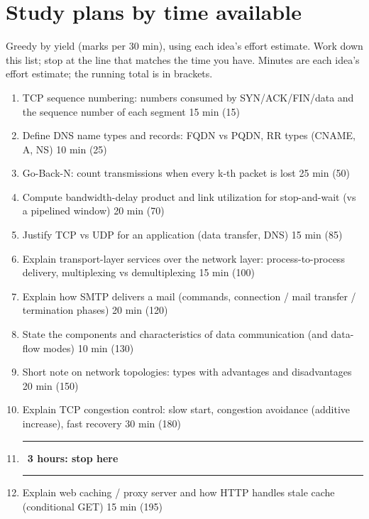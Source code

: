 \section{Study plans by time available}
Greedy by yield (marks per 30 min), using each idea's effort estimate.
Work down this list; stop at the line that matches the time you have. Minutes are each idea's effort estimate; the running total is in brackets.
\begin{enumerate}[itemsep=0pt]
\item TCP sequence numbering: numbers consumed by SYN/ACK/FIN/data and the sequence number of each segment  {\scriptsize\color{muted}15 min (15)}
\item Define DNS name types and records: FQDN vs PQDN, RR types (CNAME, A, NS)  {\scriptsize\color{muted}10 min (25)}
\item Go-Back-N: count transmissions when every k-th packet is lost  {\scriptsize\color{muted}25 min (50)}
\item Compute bandwidth-delay product and link utilization for stop-and-wait (vs a pipelined window)  {\scriptsize\color{muted}20 min (70)}
\item Justify TCP vs UDP for an application (data transfer, DNS)  {\scriptsize\color{muted}15 min (85)}
\item Explain transport-layer services over the network layer: process-to-process delivery, multiplexing vs demultiplexing  {\scriptsize\color{muted}15 min (100)}
\item Explain how SMTP delivers a mail (commands, connection / mail transfer / termination phases)  {\scriptsize\color{muted}20 min (120)}
\item State the components and characteristics of data communication (and data-flow modes)  {\scriptsize\color{muted}10 min (130)}
\item Short note on network topologies: types with advantages and disadvantages  {\scriptsize\color{muted}20 min (150)}
\item Explain TCP congestion control: slow start, congestion avoidance (additive increase), fast recovery  {\scriptsize\color{muted}30 min (180)}
\item[] \textcolor{sgred}{\rule[0.5ex]{3em}{0.6pt}\ \textbf{3 hours: stop here}\ \rule[0.5ex]{3em}{0.6pt}}
\item Explain web caching / proxy server and how HTTP handles stale cache (conditional GET)  {\scriptsize\color{muted}15 min (195)}

\end{enumerate}

